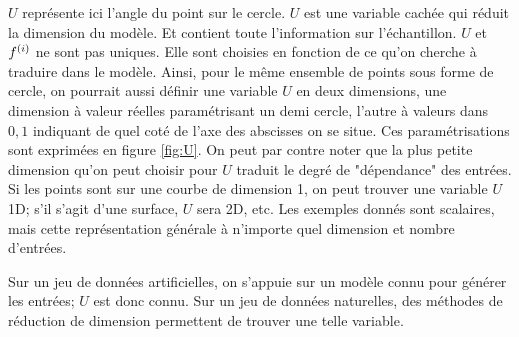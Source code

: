 $U$ représente ici l'angle du point sur le cercle. $U$ est une variable cachée qui réduit la dimension du modèle. Et contient toute l'information sur l'échantillon. 
$U$ et $f^{({i})}$ ne sont pas uniques. Elle sont choisies en fonction de ce qu'on cherche à traduire dans le modèle. Ainsi, pour le même ensemble de points sous forme de cercle, on pourrait aussi définir une variable $U$ en deux dimensions, une dimension à valeur réelles paramétrisant un demi cercle, l'autre à valeurs dans ${0,1}$ indiquant de quel coté de l'axe des abscisses on se situe. Ces paramétrisations sont exprimées en figure \ref{fig:U}. On peut par contre noter que la plus petite dimension qu'on peut choisir pour $U$ traduit le degré de "dépendance" des entrées. Si les points sont sur une courbe de dimension 1, on peut trouver une variable $U$ 1D; s'il s'agit d'une surface, $U$ sera 2D, etc.
Les exemples donnés sont scalaires, mais cette représentation générale à n'importe quel dimension et nombre d'entrées.

Sur un jeu de données artificielles, on s'appuie sur un modèle connu pour générer les entrées; $U$ est donc connu. Sur un jeu de données naturelles, des méthodes de réduction de dimension permettent de trouver une telle variable.


